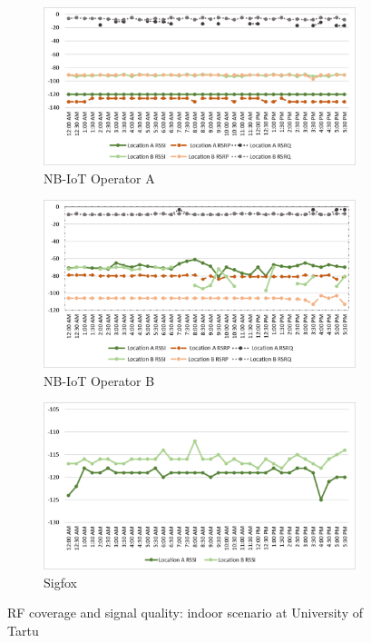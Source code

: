 \documentclass[conference,a4paper,xcolor=table]{IEEEtran}
\begin{document}
 \begin{figure}[t]
\begin{subfigure}[t]{\linewidth}
  \centering
  \includegraphics[width=.7\linewidth]{images/tartu/ATartuIndoor.pdf}  
  \caption{NB-IoT Operator A}
\end{subfigure}
\begin{subfigure}[t]{\linewidth}
  \centering
  \includegraphics[width=.7\linewidth]{images/tartu/BTartuIndoor.pdf}  
  \caption{NB-IoT Operator B}
  
\end{subfigure}
\begin{subfigure}[t]{\linewidth}
  \centering
  \includegraphics[width=.7\linewidth]{images/tartu/STartuIndoor.pdf}  
\caption{Sigfox}
 \end{subfigure}
\caption{RF coverage and signal quality: indoor scenario at University of Tartu}
 \label{RFIndoor Tartu}
\end{figure}
\end{document}
